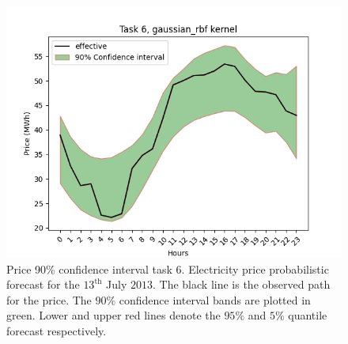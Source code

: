 \begin{figure}[!ht]
    \centering
    \includegraphics[width=\linewidth]{images/price_task_6_gaussian_rbf.png}
    \caption[Prediction price track task 6, Gaussian RBF kernel]{Price 90\% confidence interval task 6. Electricity price probabilistic forecast for the $13^{\text{th}}$ July $2013$. The black line is the observed path for the price. The $90\%$ confidence interval bands are plotted in green. Lower and upper red lines denote the $95\%$ and $5\%$ quantile forecast respectively.}
    \label{fig:price_task_6_gaussian_rbf}
\end{figure}



